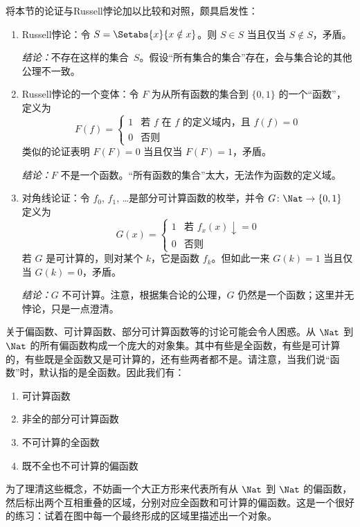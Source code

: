 \documentclass[../../../include/open-logic-section]{subfiles}
\begin{document}

将本节的论证与Russell悖论加以比较和对照，颇具启发性：

\begin{enumerate}
\item Russell悖论：令 $S = \Setabs{x}{x \notin x}$。则 $S \in S$ 当且仅当 $S \notin S$，矛盾。

  \emph{结论：}不存在这样的集合~$S$。假设“所有集合的集合”存在，会与集合论的其他公理不一致。

\item Russell悖论的一个变体：令 $F$ 为从所有函数的集合到 $\{ 0, 1 \}$ 的一个“函数”，定义为
  \[
  F(f) =
  \begin{cases}
    1 & \text{若 $f$ 在 $f$ 的定义域内，且 $f(f) = 0$} \\
    0 & \text{否则}
  \end{cases}
  \]
  类似的论证表明 $F(F) = 0$ 当且仅当 $F(F) = 1$，矛盾。

  \emph{结论：}$F$ 不是一个函数。“所有函数的集合”太大，无法作为函数的定义域。

\item 对角线论证：令 $f_0$, $f_1$, \dots 是部分可计算函数的枚举，并令 $G \colon \Nat \to
  \{ 0, 1 \}$ 定义为
  \[
  G(x) =
  \begin{cases}
    1 & \text{若 $f_x(x)\downarrow = 0$} \\
    0 & \text{否则}
  \end{cases}
  \]
  若 $G$ 是可计算的，则对某个 $k$，它是函数 $f_k$。但如此一来 $G(k) = 1$ 当且仅当 $G(k) = 0$，矛盾。

  \emph{结论：}$G$ 不可计算。注意，根据集合论的公理，$G$ 仍然是一个函数；这里并无悖论，只是一点澄清。
\end{enumerate}

关于偏函数、可计算函数、部分可计算函数等的讨论可能会令人困惑。从 $\Nat$ 到 $\Nat$ 的所有偏函数构成一个庞大的对象集。其中有些是全函数，有些是可计算的，有些既是全函数又是可计算的，还有些两者都不是。请注意，当我们说“函数”时，默认指的是全函数。因此我们有：
\begin{enumerate}
\item 可计算函数
\item 非全的部分可计算函数
\item 不可计算的全函数
\item 既不全也不可计算的偏函数
\end{enumerate}

为了理清这些概念，不妨画一个大正方形来代表所有从 $\Nat$ 到 $\Nat$ 的偏函数，然后标出两个互相重叠的区域，分别对应全函数和可计算的偏函数。这是一个很好的练习：试着在图中每一个最终形成的区域里描述出一个对象。
\end{document}
